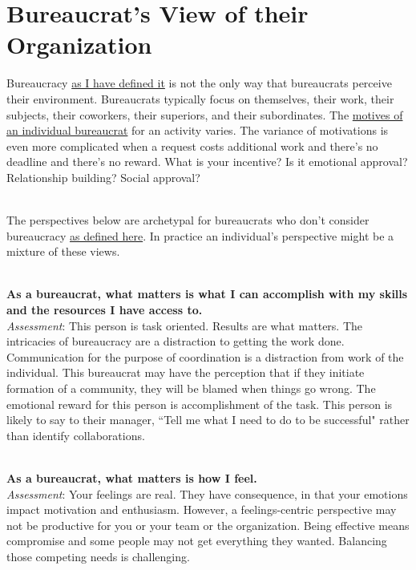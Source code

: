 \section{Bureaucrat's View of their Organization\label{sec:alternative-views-from-within}}

Bureaucracy \hyperref[sec:define-bureaucracy]{as I have defined it} 
is not the only way that bureaucrats perceive their environment. Bureaucrats typically focus on themselves, their work, their subjects, their coworkers, their superiors, and their subordinates. The \hyperref[sec:motivations]{motives of an individual bureaucrat} for an activity varies.
The variance of motivations is even more complicated when a request costs additional work and there's no deadline and there's no reward. What is your incentive? Is it emotional approval? Relationship building? Social approval?

\ \\

The perspectives below are archetypal for bureaucrats who don't consider bureaucracy \hyperref[sec:define-bureaucracy]{as defined here}.
In practice an individual's perspective might be a mixture of these views.

\ \\
\textbf{As a bureaucrat, what matters is what I can accomplish with my skills and the resources I have access to.} \\
\textit{Assessment}: This person is task oriented. Results are what matters. The intricacies of bureaucracy are a distraction to getting the work done. 
Communication  for the purpose of coordination is a distraction from work of the individual. 
This bureaucrat may have the perception that if they initiate formation of a community, they will be blamed when things go wrong.
The emotional reward for this person is accomplishment of the task. This person is likely to say to their manager, ``Tell me what I need to do to be successful" rather than identify collaborations.

\ \\
\textbf{As a bureaucrat, what matters is how I feel.} \\
\textit{Assessment}: Your feelings are real. They have consequence, in that your emotions impact motivation and enthusiasm. However, a feelings-centric perspective may not be productive for you or your team or the organization. Being effective means compromise and some people may not get everything they wanted. Balancing those competing needs is challenging.

